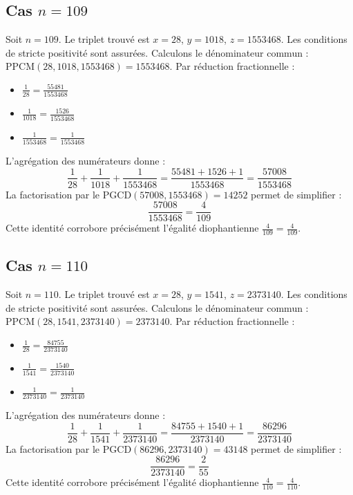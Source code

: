 \documentclass[11pt,a4paper]{article}
\begin{document}
\subsection{Cas $n = 109$}
Soit $n = 109$. Le triplet trouvé est $x = 28$, $y = 1018$, $z = 1553468$.
Les conditions de stricte positivité sont assurées.
Calculons le dénominateur commun : $\text{PPCM}(28, 1018, 1553468) = 1553468$.
Par réduction fractionnelle :
\begin{itemize}
    \item $\frac{1}{28} = \frac{55481}{1553468}$
    \item $\frac{1}{1018} = \frac{1526}{1553468}$
    \item $\frac{1}{1553468} = \frac{1}{1553468}$
\end{itemize}
L'agrégation des numérateurs donne :
$$ \frac{1}{28} + \frac{1}{1018} + \frac{1}{1553468} = \frac{55481 + 1526 + 1}{1553468} = \frac{57008}{1553468} $$
La factorisation par le $\text{PGCD}(57008, 1553468) = 14252$ permet de simplifier :
$$ \frac{57008}{1553468} = \frac{4}{109} $$
Cette identité corrobore précisément l'égalité diophantienne $\frac{4}{109} = \frac{4}{109}$.

\subsection{Cas $n = 110$}
Soit $n = 110$. Le triplet trouvé est $x = 28$, $y = 1541$, $z = 2373140$.
Les conditions de stricte positivité sont assurées.
Calculons le dénominateur commun : $\text{PPCM}(28, 1541, 2373140) = 2373140$.
Par réduction fractionnelle :
\begin{itemize}
    \item $\frac{1}{28} = \frac{84755}{2373140}$
    \item $\frac{1}{1541} = \frac{1540}{2373140}$
    \item $\frac{1}{2373140} = \frac{1}{2373140}$
\end{itemize}
L'agrégation des numérateurs donne :
$$ \frac{1}{28} + \frac{1}{1541} + \frac{1}{2373140} = \frac{84755 + 1540 + 1}{2373140} = \frac{86296}{2373140} $$
La factorisation par le $\text{PGCD}(86296, 2373140) = 43148$ permet de simplifier :
$$ \frac{86296}{2373140} = \frac{2}{55} $$
Cette identité corrobore précisément l'égalité diophantienne $\frac{4}{110} = \frac{4}{110}$.
\end{document}
